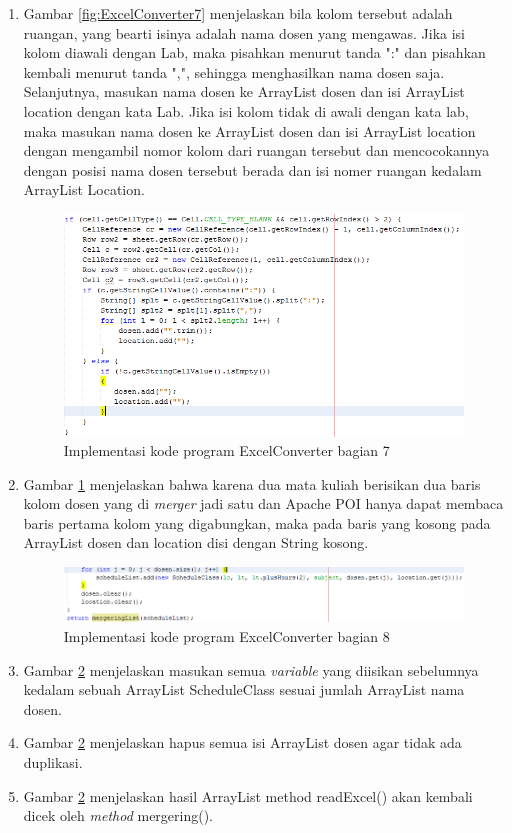 \begin{enumerate}
\begin{enumerate}
		\item Gambar \ref{fig:ExcelConverter7} menjelaskan bila kolom tersebut adalah ruangan, yang bearti isinya adalah nama dosen yang mengawas. Jika isi kolom diawali dengan Lab, maka pisahkan menurut tanda ":" dan pisahkan kembali menurut tanda ",", sehingga menghasilkan nama dosen saja. Selanjutnya, masukan nama dosen ke ArrayList dosen dan isi ArrayList location dengan kata Lab. Jika isi kolom tidak di awali dengan kata lab, maka masukan nama dosen ke ArrayList dosen dan isi ArrayList location dengan mengambil nomor kolom dari ruangan tersebut dan mencocokannya dengan posisi nama dosen tersebut berada dan isi nomer ruangan kedalam ArrayList Location.
		\begin{figure}[H]
		\centering
		\includegraphics[scale=0.7]{Gambar/excelConverter8}
		\caption{Implementasi kode program ExcelConverter  bagian 7}
		\label{fig:ExcelConverter8}
		\end{figure}
		
		\item  Gambar \ref{fig:ExcelConverter8} menjelaskan bahwa karena dua mata kuliah berisikan dua baris kolom dosen yang di \textit{merger} jadi satu dan Apache POI hanya dapat membaca baris pertama kolom yang digabungkan, maka pada baris yang kosong pada ArrayList dosen dan location disi dengan String kosong.
		\begin{figure}[H]
		\centering
		\includegraphics[scale=0.7]{Gambar/excelConverter9}
		\caption{Implementasi kode program ExcelConverter  bagian 8}
		\label{fig:ExcelConverter9}
		\end{figure}
		\item Gambar \ref{fig:ExcelConverter9} menjelaskan masukan semua \textit{variable} yang diisikan sebelumnya kedalam sebuah ArrayList ScheduleClass sesuai jumlah ArrayList nama dosen.
		\item Gambar \ref{fig:ExcelConverter9} menjelaskan hapus semua isi ArrayList dosen agar tidak ada duplikasi.
		\item Gambar \ref{fig:ExcelConverter9} menjelaskan hasil ArrayList method readExcel() akan kembali dicek oleh \textit{method} mergering().
		

\end{enumerate}
\end{enumerate}
